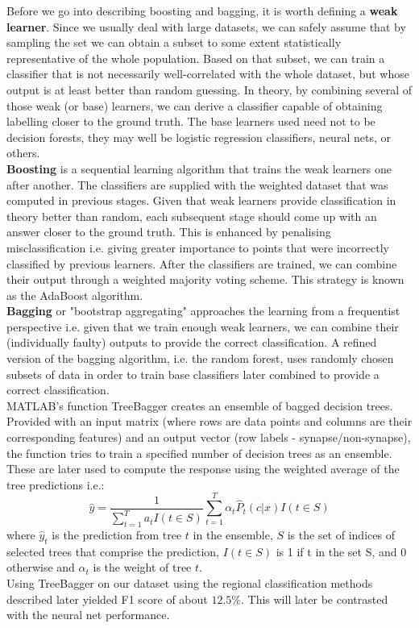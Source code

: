 \documentclass[a4paper, 11pt]{article}
\numberwithin{equation}{section}
\begin{document}
		\noindent Before we go into describing boosting and bagging, it is worth defining a \textbf{weak learner}. Since we usually deal with large datasets, we can safely assume that by sampling the set we can obtain a subset to some extent statistically representative of the whole population. Based on that subset, we can train a classifier that is not necessarily well-correlated with the whole dataset, but whose output is at least better than random guessing. In theory, by combining several of those weak (or base) learners, we can derive a classifier capable of obtaining labelling closer to the ground truth.  The base learners used need not to be decision forests, they may well be logistic regression classifiers, neural nets, or others.\\
		
		\noindent \textbf{Boosting} \cite{bishop2006pattern} is a sequential learning algorithm that trains the weak learners one after another. The classifiers are supplied with the weighted dataset that was computed in previous stages. Given that weak learners provide classification in theory better than random, each subsequent stage should come up with an answer closer to the ground truth. This is enhanced by penalising misclassification i.e. giving greater importance to points that were incorrectly classified by previous learners. After the classifiers are trained, we can combine their output through a weighted majority voting scheme. This strategy is known as the AdaBoost algorithm.\\
		
		\noindent \textbf{Bagging} \cite{murphy2012machine} or "bootstrap aggregating" approaches the learning from a frequentist perspective i.e. given that we train enough weak learners, we can combine their (individually faulty) outputs to provide the correct classification. A refined version of the bagging algorithm, i.e. the random forest, uses randomly chosen subsets of data in order to train base classifiers later combined to provide a correct classification. \\
		
		\noindent MATLAB's function TreeBagger \cite{matlab2015treebagger} creates an ensemble of bagged decision trees. Provided with an input matrix (where rows are data points and columns are their corresponding features) and an output vector (row labels - synapse/non-synapse), the function tries to train a specified number of decision trees as an ensemble. These are later used to compute the response using the weighted average of the tree predictions i.e.:
		\begin{equation}
		\hat{y} = \dfrac{1}{\sum_{t=1}^{T} a_t I(t \in S)} \sum_{t=1}^{T} \alpha_t \hat{P}_t(c|x)I(t\in S)
		\end{equation}
		where $\hat{y}_t$ is the prediction from tree $t$ in the ensemble, $S$ is the set of indices of selected trees that comprise the prediction, $I(t\in S)$ is 1 if t in the set S, and 0 otherwise and $\alpha_t$ is the weight of tree $t$.\\
		Using TreeBagger on our dataset using the regional classification methods described later yielded F1 score of about $12.5\%$. This will later be contrasted with the neural net performance. \\
		
\end{document}
